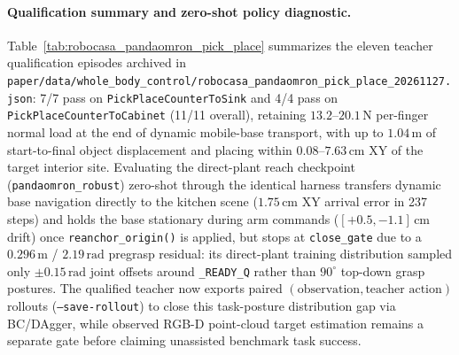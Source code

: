 \paragraph{Qualification summary and zero-shot policy diagnostic.}
Table~\ref{tab:robocasa_pandaomron_pick_place} summarizes the eleven teacher
qualification episodes archived in
\texttt{paper/data/whole\_body\_control/robocasa\_pandaomron\_pick\_place\_20261127.json}:
7/7 pass on \texttt{PickPlaceCounterToSink} and 4/4 pass on
\texttt{PickPlaceCounterToCabinet} (11/11 overall), retaining $13.2\text{--}20.1\,\text{N}$
per-finger normal load at the end of dynamic mobile-base transport, with up to
$1.04\,\text{m}$ of start-to-final object displacement and placing within $0.08\text{--}7.63\,\text{cm}$ XY of the target
interior site.
Evaluating the direct-plant reach checkpoint (\texttt{pandaomron\_robust})
zero-shot through the identical harness transfers dynamic base navigation directly
to the kitchen scene ($1.75\,\text{cm}$ XY arrival error in 237 steps) and holds
the base stationary during arm commands ($[+0.5, -1.1]\,\text{cm}$ drift) once
\texttt{reanchor\_origin()} is applied, but stops at \texttt{close\_gate} due to
a $0.296\,\text{m}$ / $2.19\,\text{rad}$ pregrasp residual: its direct-plant
training distribution sampled only $\pm 0.15\,\text{rad}$ joint offsets around
\texttt{\_READY\_Q} rather than $90^\circ$ top-down grasp postures.
The qualified teacher now exports paired $(\text{observation}, \text{teacher action})$
rollouts (\texttt{--save-rollout}) to close this task-posture distribution gap via
BC/DAgger, while observed RGB-D point-cloud target estimation remains a separate
gate before claiming unassisted benchmark task success.
